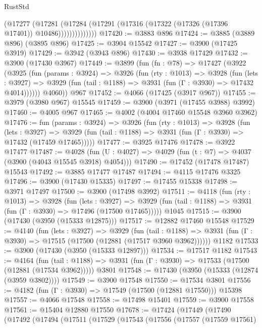 \begin{lexlean}{RustStd}
\begin{coremodule}
                    (@17277
                      (@17281
                        (@17284
                          (@17291 (@17316 (@17322 (@17326 (@17396 @17401)) @10486))))))))))))))
@17420 := @3883 @896
@17424 := @3885 (@3889 @896) (@3895 @896)
@17425 := @3904 @15542
@17427 := @3900 (@17425 @3919)
@17429 := @3942 (@3943 @896)
@17430 := @3938 @17429
@17432 := @3900 (@17430 @3967)
@17449 := @3899
    (fun (fn : @78) =>
    @17427
      (@3922
        (@3925
          (fun (params : @3924) =>
          @3926
            (fun (rty : @1013) =>
            @3928
              (fun (lets : @3927) =>
              @3929 (fun (tail : @1188) => @3931 (fun (Γ : @3930) => @17432 @4014))))))
        @4060))
    @967
@17452 := @4066 (@17425 (@3917 @967))
@17455 := @3979 (@3980 @967) @15545
@17459 := @3900 (@3971 (@17455 @3988) @3992)
@17460 := @4005 @967
@17465 := @4002 (@4004 @17460 @15548 @3960 @3962)
@17476 := fun (params : @3924) =>
  @3926
    (fun (rty : @1013) =>
    @3928
      (fun (lets : @3927) =>
      @3929 (fun (tail : @1188) => @3931 (fun (Γ : @3930) => @17432 (@17459 @17465)))))
@17477 := @3925 @17476
@17478 := @3922 @17477
@17487 := @4028
    (fun (U : @4027) => @4029 (fun (t : @7) => @4037 (@3900 (@4043 @15545 @3918) @4054)))
@17490 := @17452 (@17478 @17487) @15543
@17492 := @3885 @17477 @17487
@17494 := @4115 @17476 @3325
@17496 := @3900 (@17430 @15335)
@17497 := @17455 @15338
@17498 := @3971 @17497
@17500 := @3900 (@17498 @3992)
@17511 := @4118
    (fun (rty : @1013) =>
    @3928
      (fun (lets : @3927) =>
      @3929 (fun (tail : @1188) => @3931 (fun (Γ : @3930) => @17496 (@17500 @17465)))))
    @1045
@17515 := @3900 (@17430 (@3950 (@15333 @12875)))
@17517 := @12882 @17460 @15548
@17529 := @4140
    (fun (lets : @3927) =>
    @3929
      (fun (tail : @1188) =>
      @3931 (fun (Γ : @3930) => @17515 (@17500 (@12881 (@17517 @3960 @3962))))))
    @1182
@17533 := @3900 (@17430 (@3950 (@15333 @12897)))
@17534 := @17517 @1182
@17543 := @4164
    (fun (tail : @1188) => @3931 (fun (Γ : @3930) => @17533 (@17500 (@12881 (@17534 @3962)))))
    @3801
@17548 := @17430 (@3950 (@15333 (@12874 (@3959 @3802))))
@17549 := @3900 @17548
@17550 := @17534 @3801
@17556 := @4182 (fun (Γ : @3930) => @17549 (@17500 (@12881 @17550))) @15398
@17557 := @4066 @17548
@17558 := @17498 @15401
@17559 := @3900 @17558
@17561 := @15404 @12880 @17550
@17678 := @17424
    (@17449
      (@17490
        (@17492
          (@17494
            (@17511
              (@17529
                (@17543
                  (@17556
                    (@17557
                      (@17559 @17561)

\end{coremodule}
\end{lexlean}
